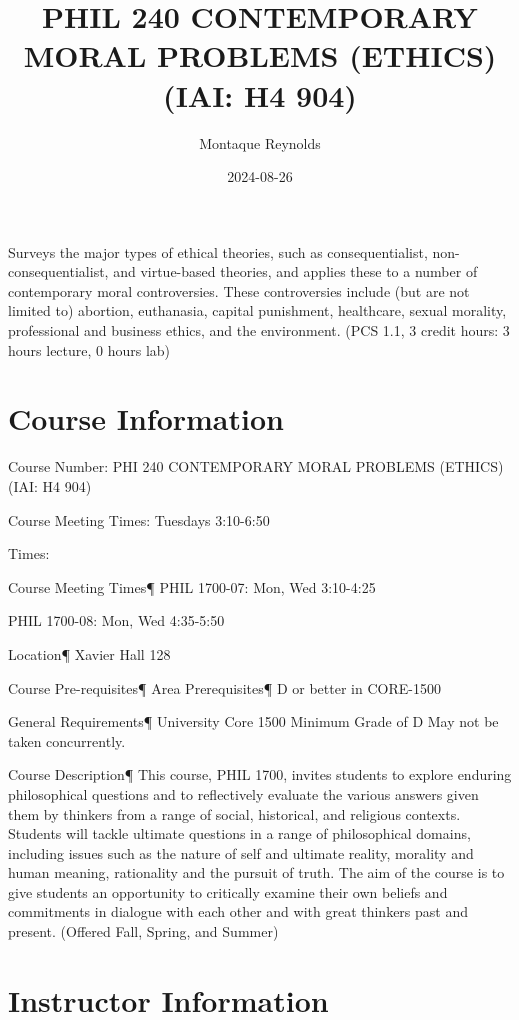 \documentclass[
]{book}
\title{PHIL 240 CONTEMPORARY MORAL PROBLEMS (ETHICS) (IAI: H4 904)}
\author{Montaque Reynolds}
\date{2024-08-26}
\begin{document}
\maketitle

{
\setcounter{tocdepth}{1}
\tableofcontents
}
Surveys the major types of ethical theories, such as consequentialist, non-consequentialist, and virtue-based theories, and applies these to a number of contemporary moral controversies. These
controversies include (but are not limited to) abortion, euthanasia, capital punishment, healthcare, sexual morality, professional and business ethics, and the environment. (PCS 1.1, 3 credit hours: 3 hours lecture, 0 hours lab)

\hypertarget{course-information}{%
\chapter{Course Information}\label{course-information}}

Course Number: PHI 240 CONTEMPORARY MORAL PROBLEMS (ETHICS) (IAI: H4 904)

Course Meeting Times: Tuesdays 3:10-6:50

Times:

Course Meeting Times¶
PHIL 1700-07: Mon, Wed 3:10-4:25

PHIL 1700-08: Mon, Wed 4:35-5:50

Location¶
Xavier Hall 128

Course Pre-requisites¶
Area Prerequisites¶
D or better in CORE-1500

General Requirements¶
University Core 1500 Minimum Grade of D May not be taken concurrently.

Course Description¶
This course, PHIL 1700, invites students to explore enduring philosophical questions and to reflectively evaluate the various answers given them by thinkers from a range of social, historical, and religious contexts. Students will tackle ultimate questions in a range of philosophical domains, including issues such as the nature of self and ultimate reality, morality and human meaning, rationality and the pursuit of truth. The aim of the course is to give students an opportunity to critically examine their own beliefs and commitments in dialogue with each other and with great thinkers past and present. (Offered Fall, Spring, and Summer)

\hypertarget{instructor-information}{%
\chapter{Instructor Information}\label{instructor-information}}
\end{document}
